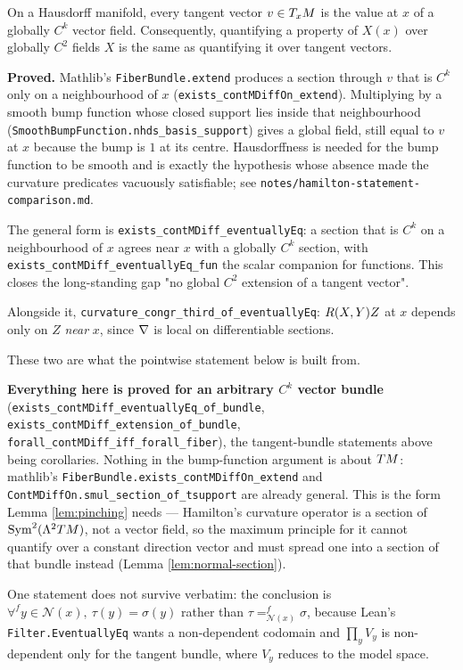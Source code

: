 \begin{lemma}
  \label{lem:global-extension}
  \leanok
  On a Hausdorff manifold, every tangent vector $v \in T_xM$ is the value at $x$
  of a globally $C^k$ vector field. Consequently, quantifying a property of
  $X(x)$ over globally $C^2$ fields $X$ is the same as quantifying it over
  tangent vectors.

  \textbf{Proved.} Mathlib's \texttt{FiberBundle.extend} produces a section
  through $v$ that is $C^k$ only on a neighbourhood of $x$
  (\texttt{exists\_contMDiffOn\_extend}). Multiplying by a smooth bump function
  whose closed support lies inside that neighbourhood
  (\texttt{SmoothBumpFunction.nhds\_basis\_support}) gives a global field, still
  equal to $v$ at $x$ because the bump is $1$ at its centre. Hausdorffness is
  needed for the bump function to be smooth and is exactly the hypothesis whose
  absence made the curvature predicates vacuously satisfiable; see
  \texttt{notes/hamilton-statement-comparison.md}.

  The general form is \texttt{exists\_contMDiff\_eventuallyEq}: a section that is
  $C^k$ on a neighbourhood of $x$ agrees near $x$ with a globally $C^k$ section,
  with \texttt{exists\_contMDiff\_eventuallyEq\_fun} the scalar companion for
  functions.
  This closes the long-standing gap "no global $C^2$ extension of a tangent
  vector".

  Alongside it, \texttt{curvature\_congr\_third\_of\_eventuallyEq}: $R(X,Y)Z$
  at $x$ depends only on $Z$ \emph{near} $x$, since $\nabla$ is local on
  differentiable sections.

  These two are what the pointwise statement below is built from.

  \textbf{Everything here is proved for an arbitrary $C^k$ vector bundle}
  (\texttt{exists\_contMDiff\_eventuallyEq\_of\_bundle},
  \texttt{exists\_contMDiff\_extension\_of\_bundle},
  \texttt{forall\_contMDiff\_iff\_forall\_fiber}), the tangent-bundle statements above being
  corollaries. Nothing in the bump-function argument is about $TM$: mathlib's
  \texttt{FiberBundle.exists\_contMDiffOn\_extend} and
  \texttt{ContMDiffOn.smul\_section\_of\_tsupport} are already general. This is the form
  Lemma \ref{lem:pinching} needs --- Hamilton's curvature operator is a section of
  $\mathrm{Sym}^2(\Lambda^2 TM)$, not a vector field, so the maximum principle for it cannot
  quantify over a constant direction vector and must spread one into a section of that
  bundle instead (Lemma \ref{lem:normal-section}).

  One statement does not survive verbatim: the conclusion is
  $\forall^f y \in \mathcal{N}(x),\ \tau(y) = \sigma(y)$ rather than
  $\tau =^f_{\mathcal{N}(x)} \sigma$, because Lean's \texttt{Filter.EventuallyEq} wants a
  non-dependent codomain and $\prod_y V_y$ is non-dependent only for the tangent bundle,
  where $V_y$ reduces to the model space.
\end{lemma}

